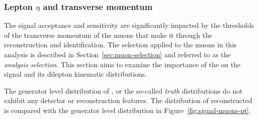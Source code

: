 \subsubsection{Lepton $\eta$ and transverse momentum \pt}
\label{sec:muon-eta-pt}

The signal acceptance and sensitivity are significantly impacted by the thresholds of the transverse momentum \pt of the muons that make it through the reconstruction and identification. The selection applied to the muons in this analysis is described in Section~\ref{sec:muon-selection} and referred to as the \emph{analysis selection}. This section aims to examine the importance of the \pt on the signal and its dilepton kinematic distributions.

The generator level distribution of \pt, or the so-called \emph{truth} distributions do not exhibit any detector or reconstruction features. The distribution of reconstructed \pt is compared with the generator level distribution in Figure~\ref{fig:signal-muons-pt}. 

